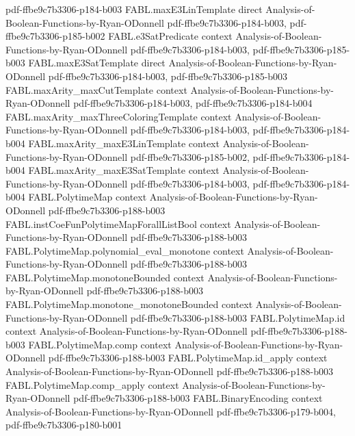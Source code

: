\begin{theorem}
  {pdf-ffbe9c7b3306-p184-b003}
\proofstep
  {FABL.maxE3LinTemplate}
  {direct}
  {Analysis-of-Boolean-Functions-by-Ryan-ODonnell}
  {pdf-ffbe9c7b3306-p184-b003,
    pdf-ffbe9c7b3306-p185-b002}
\proofstep
  {FABL.e3SatPredicate}
  {context}
  {Analysis-of-Boolean-Functions-by-Ryan-ODonnell}
  {pdf-ffbe9c7b3306-p184-b003,
    pdf-ffbe9c7b3306-p185-b003}
\proofstep
  {FABL.maxE3SatTemplate}
  {direct}
  {Analysis-of-Boolean-Functions-by-Ryan-ODonnell}
  {pdf-ffbe9c7b3306-p184-b003,
    pdf-ffbe9c7b3306-p185-b003}
\proofstep
  {FABL.maxArity_maxCutTemplate}
  {context}
  {Analysis-of-Boolean-Functions-by-Ryan-ODonnell}
  {pdf-ffbe9c7b3306-p184-b003,
    pdf-ffbe9c7b3306-p184-b004}
\proofstep
  {FABL.maxArity_maxThreeColoringTemplate}
  {context}
  {Analysis-of-Boolean-Functions-by-Ryan-ODonnell}
  {pdf-ffbe9c7b3306-p184-b003,
    pdf-ffbe9c7b3306-p184-b004}
\proofstep
  {FABL.maxArity_maxE3LinTemplate}
  {context}
  {Analysis-of-Boolean-Functions-by-Ryan-ODonnell}
  {pdf-ffbe9c7b3306-p185-b002,
    pdf-ffbe9c7b3306-p184-b004}
\proofstep
  {FABL.maxArity_maxE3SatTemplate}
  {context}
  {Analysis-of-Boolean-Functions-by-Ryan-ODonnell}
  {pdf-ffbe9c7b3306-p184-b003,
    pdf-ffbe9c7b3306-p184-b004}
\proofstep
  {FABL.PolytimeMap}
  {context}
  {Analysis-of-Boolean-Functions-by-Ryan-ODonnell}
  {pdf-ffbe9c7b3306-p188-b003}
\proofstep
  {FABL.instCoeFunPolytimeMapForallListBool}
  {context}
  {Analysis-of-Boolean-Functions-by-Ryan-ODonnell}
  {pdf-ffbe9c7b3306-p188-b003}
\proofstep
  {FABL.PolytimeMap.polynomial_eval_monotone}
  {context}
  {Analysis-of-Boolean-Functions-by-Ryan-ODonnell}
  {pdf-ffbe9c7b3306-p188-b003}
\proofstep
  {FABL.PolytimeMap.monotoneBounded}
  {context}
  {Analysis-of-Boolean-Functions-by-Ryan-ODonnell}
  {pdf-ffbe9c7b3306-p188-b003}
\proofstep
  {FABL.PolytimeMap.monotone_monotoneBounded}
  {context}
  {Analysis-of-Boolean-Functions-by-Ryan-ODonnell}
  {pdf-ffbe9c7b3306-p188-b003}
\proofstep
  {FABL.PolytimeMap.id}
  {context}
  {Analysis-of-Boolean-Functions-by-Ryan-ODonnell}
  {pdf-ffbe9c7b3306-p188-b003}
\proofstep
  {FABL.PolytimeMap.comp}
  {context}
  {Analysis-of-Boolean-Functions-by-Ryan-ODonnell}
  {pdf-ffbe9c7b3306-p188-b003}
\proofstep
  {FABL.PolytimeMap.id_apply}
  {context}
  {Analysis-of-Boolean-Functions-by-Ryan-ODonnell}
  {pdf-ffbe9c7b3306-p188-b003}
\proofstep
  {FABL.PolytimeMap.comp_apply}
  {context}
  {Analysis-of-Boolean-Functions-by-Ryan-ODonnell}
  {pdf-ffbe9c7b3306-p188-b003}
\proofstep
  {FABL.BinaryEncoding}
  {context}
  {Analysis-of-Boolean-Functions-by-Ryan-ODonnell}
  {pdf-ffbe9c7b3306-p179-b004,
    pdf-ffbe9c7b3306-p180-b001}

\end{theorem}
